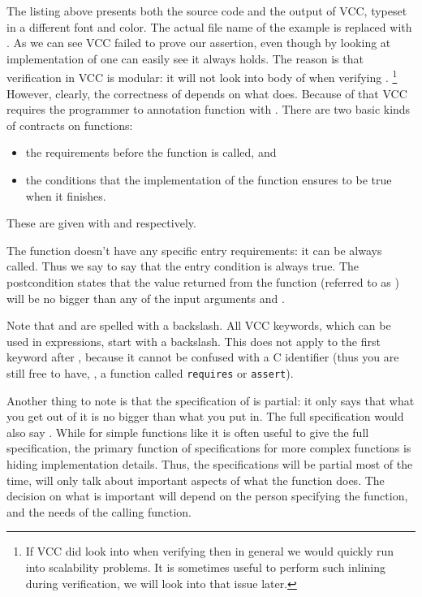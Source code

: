 
\noindent
The listing above presents both the source code and the output
of VCC, typeset in a different font and color.
The actual file name of the example is replaced with .
As we can see VCC failed to prove our assertion,
even though by looking at implementation of 
one can easily see it always holds.
The reason is that verification in VCC is modular:
it will not look into body of  when
verifying .%
\footnote{
  If VCC did look into  when verifying 
  then in general we would quickly run into scalability problems.
  It is sometimes useful to perform such inlining during verification,
  we will look into that issue later.
}
However, clearly, the correctness of  depends on what 
does.
Because of that VCC requires the programmer to annotation function
with .
There are two basic kinds of contracts on functions:
\begin{itemize}
\item the requirements before the function is called, and
\item the conditions that the implementation of the function ensures to be true when it finishes.
\end{itemize}
These are given with  and  respectively.


\noindent
The function  doesn't have any specific entry requirements:
it can be always called.
Thus we say  to say that the entry condition is
always true.
The postcondition states that the value returned from the function (referred to as \vcc{\result})
will be no bigger than any of the input arguments  and .

Note that \vcc{\true} and \vcc{\result} are spelled with a backslash.
All VCC keywords, which can be used in expressions, start with a backslash.
This does not apply to the first keyword after , because it cannot
be confused with a C identifier (thus you are still free to have, \eg,
a function called \texttt{requires} or \texttt{assert}).

Another thing to note is that the specification of  is partial:
it only says that what you get out of it is no bigger than what you put in.
The full specification would also say .
While for simple functions like  it is often useful to give the full
specification, the primary function of specifications for more complex
functions is hiding implementation details.
Thus, the specifications will be partial most of the time, will only
talk about important aspects of what the function does.
The decision on what is important will depend on the person specifying
the function, and the needs of the calling function.

